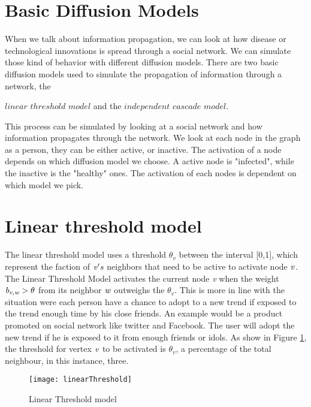 \section{Basic Diffusion Models}
When we talk about information propagation, we can look at how disease or technological innovations is spread through a social network. We can simulate those kind of behavior with different diffusion models. There are two basic diffusion models used to simulate the propagation of information through a network\cite{MaximizeSpread2003}, the {$linear$ $threshold$ $model$ and the $ independent$ $cascade$ $model$\cite{MaximizeSpread2003}.

This process can be simulated by looking at a social network and how information propagates through the network. We look at each node in the graph as a person, they can be either active, or inactive. The activation of a node depends on which diffusion model we choose. A active node is "infected", while the inactive is the "healthy" ones. The activation of each nodes is dependent on which model we pick.

\section{Linear threshold model}
The linear threshold model uses a threshold $\theta_v$ between the interval [0,1], which represent the faction of $\it{v}'s$ neighbors that need to be active to activate node $\it{v}$. The Linear Threshold Model activates the current node {\it v} when the weight ${\it b_{v,w}} > \theta$ from its neighbor $\it{w}$ outweighs the $\theta_v$. This is more in line with the situation were each person have a chance to adopt to a new trend if exposed to the trend enough time by his close friends. An example would be a product promoted on social network like twitter and Facebook. The user will adopt the new trend if he is exposed to it from enough friends or idols. As show in Figure \ref{fig:linearThresh}, the threshold for vertex $\it{v}$ to be activated is $\theta_v$, a percentage of the total neighbour, in this instance, three.

\begin{figure}[!ht]
	\texttt{[image: linearThreshold]}
	\caption{Linear Threshold model} 
	\label{fig:linearThresh}
\end{figure}

}
